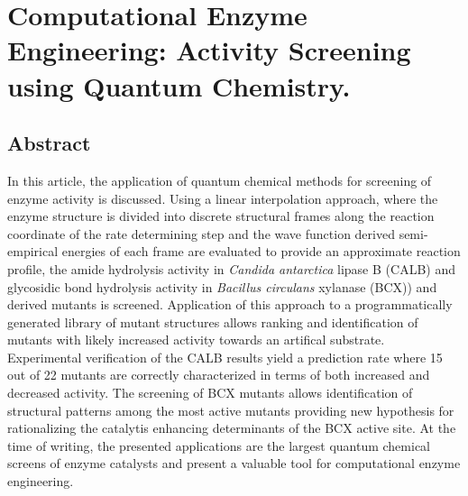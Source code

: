 \chapter[Computational Enzyme Engineering: Activity Screening using Quantum Chemistry.]
{Computational Enzyme Engineering: Activity Screening using Quantum Chemistry.\label{ch1}}


\section{Abstract}\label{sec:abstract}
In this article, the application of quantum chemical methods for screening of enzyme activity is discussed.
Using a linear interpolation approach, where the enzyme structure is divided into discrete structural frames along the reaction coordinate of the rate determining step and the wave function derived semi-empirical energies of each frame are evaluated to provide an approximate reaction profile, the amide hydrolysis activity in \textit{Candida antarctica} lipase B (CALB) and glycosidic bond hydrolysis activity in \textit{Bacillus circulans} xylanase (BCX)) and derived mutants is screened.
Application of this approach to a programmatically generated library of mutant structures allows ranking and identification of mutants with likely increased activity towards an artifical substrate.
Experimental verification of the CALB results yield a prediction rate where 15 out of 22 mutants are correctly characterized in terms of both increased and decreased activity.
The screening of BCX mutants allows identification of structural patterns among the most active mutants providing new hypothesis for rationalizing the catalytis enhancing determinants of the BCX active site.
At the time of writing, the presented applications are the largest quantum chemical screens of enzyme catalysts and present a valuable tool for computational enzyme engineering.


